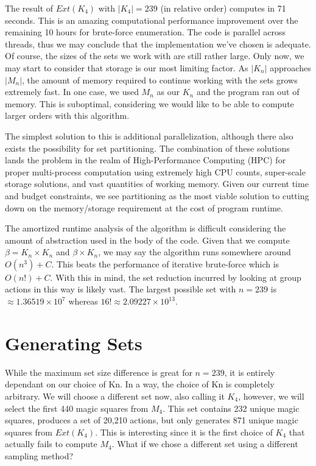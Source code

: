 \documentclass[12pt]{report}
\begin{document}
\par The result of $Ext\left(K_4\right)$ with $\left|K_4\right|=239$ (in relative order) computes
in 71
seconds. This is an amazing computational performance improvement over the remaining 10 hours for
brute-force enumeration. The code is parallel across threads, thus we may conclude that the
implementation we've chosen is adequate. Of course, the sizes of the sets we work with are still
rather large. Only now, we may start to consider that storage is our most limiting factor. As
$\left|K_n\right|$ approaches $\left|M_n\right|$, the amount of memory required to continue working
with the sets grows extremely fast. In one case, we used $M_n$ as our $K_n$ and the program ran out
of memory. This is suboptimal, considering we would like to be able to compute larger orders with
this algorithm.

\par The simplest solution to this is additional parallelization, although there also exists the
possibility for set partitioning. The combination of these solutions lands the problem in the realm
of High-Performance Computing (HPC) for proper multi-process computation using extremely high CPU
counts, super-scale storage solutions, and vast quantities of working memory. Given our current
time and budget constraints, we see partitioning as the most viable solution to cutting down on the
memory/storage requirement at the cost of program runtime.

\par The amortized runtime analysis of the algorithm is difficult considering the amount of
abstraction used in the body of the code. Given that we compute $\beta = K_n \times K_n$ and $\beta
  \times K_n$, we may say the algorithm runs somewhere around $O\left(n^3\right)+C$. This beats the
performance of iterative brute-force which is $O\left(n!\right)+C$. With this in mind, the set
reduction incurred by looking at group actions in this way is likely vast. The largest possible set
with $n=239$ is $\approx 1.36519 \times 10^7$ whereas $16!\approx 2.09227 \times 10^{13}$.

\section{Generating Sets}

\par While the maximum set size difference is great for $n=239$, it is entirely dependant on our
choice of Kn. In a way, the choice of Kn is completely arbitrary. We will choose a different set
now, also calling it $K_4$, however, we will select the first 440 magic squares from $M_4$. This
set contains 232 unique magic squares, produces a set of 20,210 actions, but only generates 871
unique magic squares from $Ext\left(K_4\right)$. This is interesting since it is the first choice
of $K_4$ that actually fails to compute $M_4$. What if we chose a different set using a different
sampling method?
\end{document}
